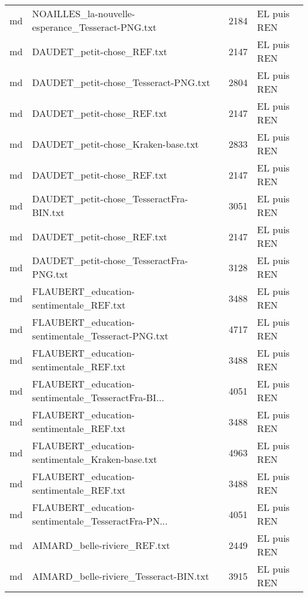 \begin{tabular}{llrl}
    md &   NOAILLES\_la-nouvelle-esperance\_Tesseract-PNG.txt &                  2184 & EL puis REN \\
    md &                         DAUDET\_petit-chose\_REF.txt &                  2147 & EL puis REN \\
    md &               DAUDET\_petit-chose\_Tesseract-PNG.txt &                  2804 & EL puis REN \\
    md &                         DAUDET\_petit-chose\_REF.txt &                  2147 & EL puis REN \\
    md &                 DAUDET\_petit-chose\_Kraken-base.txt &                  2833 & EL puis REN \\
    md &                         DAUDET\_petit-chose\_REF.txt &                  2147 & EL puis REN \\
    md &            DAUDET\_petit-chose\_TesseractFra-BIN.txt &                  3051 & EL puis REN \\
    md &                         DAUDET\_petit-chose\_REF.txt &                  2147 & EL puis REN \\
    md &            DAUDET\_petit-chose\_TesseractFra-PNG.txt &                  3128 & EL puis REN \\
    md &            FLAUBERT\_education-sentimentale\_REF.txt &                  3488 & EL puis REN \\
    md &  FLAUBERT\_education-sentimentale\_Tesseract-PNG.txt &                  4717 & EL puis REN \\
    md &            FLAUBERT\_education-sentimentale\_REF.txt &                  3488 & EL puis REN \\
    md & FLAUBERT\_education-sentimentale\_TesseractFra-BI... &                  4051 & EL puis REN \\
    md &            FLAUBERT\_education-sentimentale\_REF.txt &                  3488 & EL puis REN \\
    md &    FLAUBERT\_education-sentimentale\_Kraken-base.txt &                  4963 & EL puis REN \\
    md &            FLAUBERT\_education-sentimentale\_REF.txt &                  3488 & EL puis REN \\
    md & FLAUBERT\_education-sentimentale\_TesseractFra-PN... &                  4051 & EL puis REN \\
    md &                       AIMARD\_belle-riviere\_REF.txt &                  2449 & EL puis REN \\
    md &             AIMARD\_belle-riviere\_Tesseract-BIN.txt &                  3915 & EL puis REN \\

\end{tabular}
